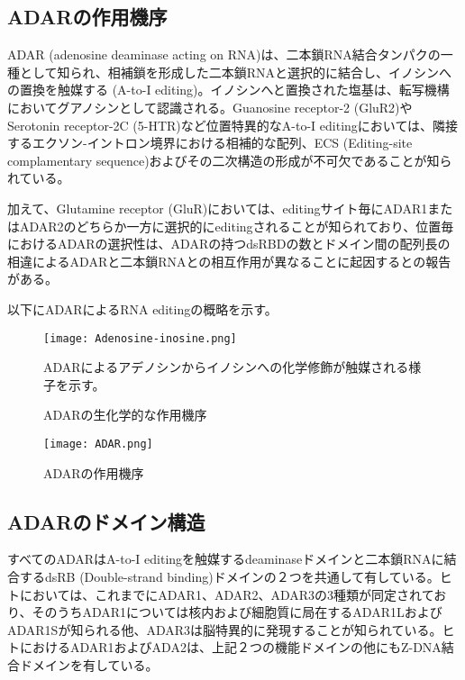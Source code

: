 \subsection{ADARの作用機序}
ADAR (adenosine deaminase acting on RNA)は、二本鎖RNA結合タンパクの一種として知られ、相補鎖を形成した二本鎖RNAと選択的に結合し、イノシンへの置換を触媒する (A-to-I editing)。イノシンへと置換された塩基は、転写機構においてグアノシンとして認識される。Guanosine receptor-2 (GluR2)やSerotonin receptor-2C (5-HTR)など位置特異的なA-to-I editingにおいては、隣接するエクソン-イントロン境界における相補的な配列、ECS (Editing-site complamentary sequence)およびその二次構造の形成が不可欠であることが知られている。
\par
加えて、Glutamine receptor (GluR)においては、editingサイト毎にADAR1またはADAR2のどちらか一方に選択的にeditingされることが知られており、位置毎におけるADARの選択性は、ADARの持つdsRBDの数とドメイン間の配列長の相違によるADARと二本鎖RNAとの相互作用が異なることに起因するとの報告がある。

以下にADARによるRNA editingの概略を示す。
\begin{figure}[htbp]
	\begin{center}
		\texttt{[image: Adenosine-inosine.png]}
	\end{center}
	\caption{ADARの生化学的な作用機序}
	\begin{flushleft}
		\normalsize{ADARによるアデノシンからイノシンへの化学修飾が触媒される様子を示す。}
	\end{flushleft}
	\label{fig:Chemical_reaction}
\end{figure}

\begin{figure}[htbp]
	\begin{center}
		\texttt{[image: ADAR.png]}
	\end{center}
	\caption{ADARの作用機序}
\end{figure}

\subsection{ADARのドメイン構造}
すべてのADARはA-to-I editingを触媒するdeaminaseドメインと二本鎖RNAに結合するdsRB (Double-strand binding)ドメインの２つを共通して有している。ヒトにおいては、これまでにADAR1、ADAR2、ADAR3の3種類が同定されており、そのうちADAR1については核内および細胞質に局在するADAR1LおよびADAR1Sが知られる他、ADAR3は脳特異的に発現することが知られている。ヒトにおけるADAR1およびADA2は、上記２つの機能ドメインの他にもZ-DNA結合ドメインを有している。

